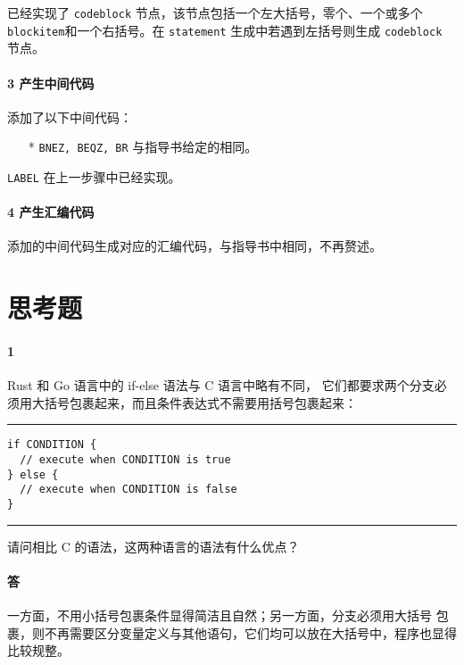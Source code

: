\documentclass[UTF8]{ctexart}
\newcommand{\T}[1]{\texttt{{#1}}}
\begin{document}
            已经实现了 \T{codeblock} 节点，该节点包括一个左大括号，零个、一个或多个\T{blockitem}和一个右括号。在 \T{statement} 
            生成中若遇到左括号则生成 \T{codeblock} 节点。

            \paragraph{3 产生中间代码} 添加了以下中间代码：
            \begin{itemize}
                \item[*] \T{BNEZ, BEQZ, BR} 与指导书给定的相同。
            \end{itemize}

            \T{LABEL} 在上一步骤中已经实现。

            \paragraph{4 产生汇编代码} 添加的中间代码生成对应的汇编代码，与指导书中相同，不再赘述。
        
    \section{思考题}
        \paragraph{1} Rust 和 Go 语言中的 if-else 语法与 C 语言中略有不同，
        它们都要求两个分支必须用大括号包裹起来，而且条件表达式不需要用括号包裹起来：
        
        \noindent\rule{\textwidth}{1pt}
        \begin{lstlisting}[style=lfonts]
if CONDITION {
  // execute when CONDITION is true
} else {
  // execute when CONDITION is false
}
        \end{lstlisting}
        \noindent\rule{\textwidth}{1pt}

        请问相比 C 的语法，这两种语言的语法有什么优点？

        \paragraph{答} 一方面，不用小括号包裹条件显得简洁且自然；另一方面，分支必须用大括号
        包裹，则不再需要区分变量定义与其他语句，它们均可以放在大括号中，程序也显得比较规整。
\end{document}
